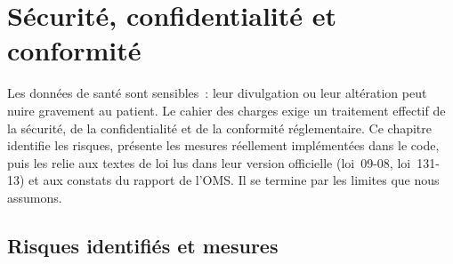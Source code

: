 \chapter{Sécurité, confidentialité et conformité}
\label{chap:securite}

\introchap

Les données de santé sont sensibles~: leur divulgation ou leur altération peut nuire gravement au patient. Le cahier des charges exige un traitement effectif de la sécurité, de la confidentialité et de la conformité réglementaire. Ce chapitre identifie les risques, présente les mesures réellement implémentées dans le code, puis les relie aux textes de loi lus dans leur version officielle (loi~09-08, loi~131-13) et aux constats du rapport de l'\ac{OMS}. Il se termine par les limites que nous assumons.

\section{Risques identifiés et mesures}

